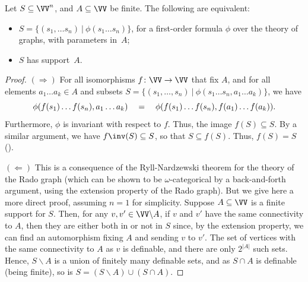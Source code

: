   \begin{proposition}\label{prop:radonom-definable-sets}
    Let $S\subseteq \VV^n$, and $A\subseteq \VV$ be finite. The following are equivalent:
    \begin{itemize}
      \item $S=\{(s_1,\dots s_n)~|~\phi(s_1\dots s_n)\}$, for a
        first-order formula
        $\phi$ over the theory of graphs, with parameters in~$A$;
      \item $S$ has support~$A$.
        \end{itemize}
      \end{proposition}
      \begin{proof}
      $(\Rightarrow)$ For all isomorphisms $f\colon \VV \to \VV$ that fix $A$, and for all elements $a_1\dots a_k \in A$ and 
      subsets
      $S=\{(s_1,\dots, s_n)~|~\phi(s_1\dots s_n, a_1\dots a_k)\}$,
      we have 
\[       \phi(f(s_1)\dots f(s_n), a_1\dots a_k) \quad= \quad
       \phi(f(s_1)\dots f(s_n), f(a_1)\dots f(a_k)) \text .
      \]
      Furthermore, $\phi$ is invariant with respect to $f$. Thus, the image $f(S) \subseteq S$. By a similar argument, we have $f\inv(S) \subseteq S$, so that $S \subseteq f(S)$. Thus, $f(S) = S$
      (\hspace{1sp}\cite[Prop. 1.3.5]{markerModelTheoryIntroduction2002}).

      $(\Leftarrow)$
      This is a consequence of the Ryll-Nardzewski theorem for the theory of the Rado graph (which can be shown to be $ω$-categorical by a back-and-forth argument, using the extension property of the Rado graph). But we give here a more direct proof, assuming $n = 1$ for simplicity. Suppose $A \subseteq \VV$ is a finite support for $S$. Then, for any $v,v' \in \VV \backslash A$, if $v$ and $v'$ have the same connectivity to $A$, then they are either both in or not in $S$ since, by the extension property, we can find an automorphism fixing $A$ and sending $v$ to $v'$. The set of vertices with the same connectivity to $A$ as $v$ is definable, and there are only $2^{|A|}$ such sets. Hence, $S \backslash A$ is a union of finitely many definable sets, and as $S \cap A$ is definable (being finite), so is $S = (S \backslash A) \cup (S \cap A)$.
      \end{proof}


